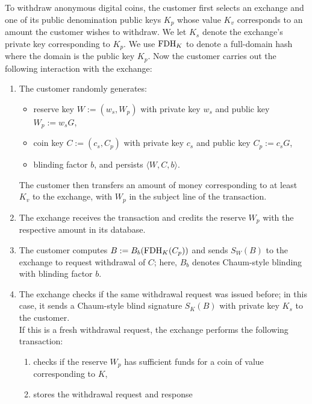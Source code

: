 \documentclass[sigconf, authordraft]{acmart}
\begin{document}
To withdraw anonymous digital coins, the customer first selects an
exchange and one of its public denomination public keys $K_p$ whose
value $K_v$ corresponds to an amount the customer wishes to withdraw.
We let $K_s$ denote the exchange's private key corresponding to $K_p$.
We use $\textrm{FDH}_K$ to denote a full-domain hash where the domain is the
public key $K_p$.  Now the customer carries out the following
interaction with the exchange:


\begin{enumerate}
  \item The customer randomly generates:
    \begin{itemize}
      \item reserve key $W := (w_s,W_p)$ with private key $w_s$ and public key $W_p := w_sG$,
      \item coin key $C := (c_s,C_p)$ with private key $c_s$ and public key $C_p := c_s G$,
      \item blinding factor $b$, and persists $\langle W, C, b \rangle$.
    \end{itemize}
    The customer then transfers an amount of money corresponding to
    at least $K_v$ to the exchange, with $W_p$ in the subject line
    of the transaction.
  \item
    The exchange receives the transaction and credits the reserve $W_p$
    with the respective amount in its database.
  \item
    The customer computes $B := B_b(\textrm{FDH}_K(C_p))$ and sends $S_W(B)$ to
    the exchange to request withdrawal of $C$; here, $B_b$ denotes
    Chaum-style blinding with blinding factor $b$.
  \item
    The exchange checks if the same withdrawal request was issued before;
    in this case, it sends a Chaum-style blind signature $S_K(B)$ with
    private key $K_s$ to the customer. \\
    If this is a fresh withdrawal request, the exchange performs the following transaction:
    \begin{enumerate}
      \item checks if the reserve $W_p$ has sufficient funds
            for a coin of value corresponding to $K$,
      \item stores the withdrawal request and response

\end{enumerate}
\end{enumerate}
\end{document}
